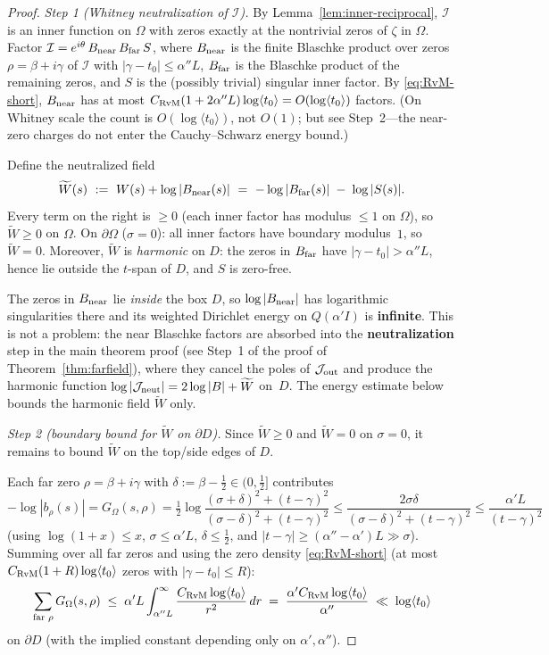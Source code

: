 \documentclass[11pt]{amsart}
\theoremstyle{definition}
\theoremstyle{remark}
\newcommand{\angles}[1]{\langle #1\rangle}
\begin{document}
{\begin{proof}
\medskip\noindent\emph{Step 1 (Whitney neutralization of $\mathcal I$).}
By Lemma~\ref{lem:inner-reciprocal}, \(\mathcal I\) is an inner function on \(\Omega\)
with zeros exactly at the nontrivial zeros of \(\zeta\) in \(\Omega\).
Factor \(\mathcal I=e^{i\theta}\,B_{\rm near}\,B_{\rm far}\,S\), where
\(B_{\rm near}\) is the finite Blaschke product over zeros \(\rho=\beta+i\gamma\) of \(\mathcal I\)
with \(|\gamma-t_0|\le \alpha''L\),
\(B_{\rm far}\) is the Blaschke product of the remaining zeros,
and \(S\) is the (possibly trivial) singular inner factor.
By \eqref{eq:RvM-short},
\(B_{\rm near}\) has at most \(C_{\rm RvM}(1+2\alpha''L)\log\angles{t_0}=O(\log\angles{t_0})\) factors.
(On Whitney scale the count is \(O(\log\angles{t_0})\), not \(O(1)\);
but see Step~2---the near-zero charges do not enter the Cauchy--Schwarz energy bound.)

Define the neutralized field
\[
  \widetilde W(s)\ :=\ W(s)+\log|B_{\rm near}(s)|
  \ =\ -\log|B_{\rm far}(s)|\;-\;\log|S(s)|.
\]
Every term on the right is \(\ge 0\) (each inner factor has modulus \(\le 1\) on \(\Omega\)),
so \(\widetilde W\ge 0\) on \(\Omega\).
On \(\partial\Omega\) (\(\sigma=0\)): all inner factors have boundary modulus~\(1\),
so \(\widetilde W=0\).
Moreover, \(\widetilde W\) is \emph{harmonic} on \(D\): the zeros in \(B_{\rm far}\) have
\(|\gamma-t_0|>\alpha''L\), hence lie outside the \(t\)-span of \(D\),
and \(S\) is zero-free.

The zeros in \(B_{\rm near}\) lie \emph{inside} the box \(D\), so
\(\log|B_{\rm near}|\) has logarithmic singularities there and its weighted Dirichlet
energy on \(Q(\alpha'I)\) is \textbf{infinite}.
This is not a problem: the near Blaschke factors are absorbed into the
\textbf{neutralization} step in the main theorem proof
(see Step~1 of the proof of Theorem~\ref{thm:farfield}),
where they cancel the poles of \(\mathcal J_{\rm out}\) and produce the harmonic
function \(\log|\mathcal J_{\rm neut}|=2\log|B|+\widetilde W\) on~\(D\).
The energy estimate below bounds the harmonic field \(\widetilde W\) only.

\medskip\noindent\emph{Step 2 (boundary bound for $\widetilde W$ on $\partial D$).}
Since \(\widetilde W\ge 0\) and \(\widetilde W=0\) on \(\sigma=0\),
it remains to bound \(\widetilde W\) on the top/side edges of \(D\).

Each far zero \(\rho=\beta+i\gamma\) with \(\delta:=\beta-\tfrac12\in(0,\tfrac12]\) contributes
\[
  -\log|b_\rho(s)|=G_\Omega(s,\rho)
  =\tfrac12\log\frac{(\sigma+\delta)^2+(t-\gamma)^2}{(\sigma-\delta)^2+(t-\gamma)^2}
  \le\frac{2\sigma\delta}{(\sigma-\delta)^2+(t-\gamma)^2}
  \le\frac{\alpha' L}{(t-\gamma)^2}
\]
(using \(\log(1+x)\le x\), \(\sigma\le\alpha'L\), \(\delta\le\tfrac12\),
and \(|t-\gamma|\ge(\alpha''-\alpha')L\gg\sigma\)).
Summing over all far zeros and using the zero density \eqref{eq:RvM-short}
(at most \(C_{\rm RvM}(1+R)\log\angles{t_0}\) zeros with \(|\gamma-t_0|\le R\)):
\[
  \sum_{\text{far }\rho}G_\Omega(s,\rho)
  \;\le\;\alpha'L\int_{\alpha''L}^{\infty}\frac{C_{\rm RvM}\log\angles{t_0}}{r^2}\,dr
  \;=\;\frac{\alpha'C_{\rm RvM}\log\angles{t_0}}{\alpha''}
  \;\ll\;\log\angles{t_0}
\]
on \(\partial D\) (with the implied constant depending only on \(\alpha',\alpha''\)).


\end{proof}}
\end{document}
